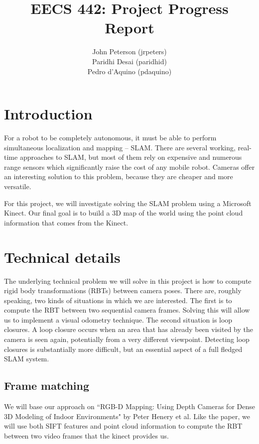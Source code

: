 \documentclass[12pt]{article}
\title{EECS 442: Project Progress Report}
\author{
	John Peterson (jrpeters)\\
	Paridhi Desai (paridhid)\\
	Pedro d'Aquino (pdaquino)}
\begin{document}
\maketitle

\section{Introduction}
For a robot to be completely autonomous, it must be able to perform simultaneous localization and
mapping -- SLAM. There are several working, real-time approaches to SLAM, but most of them
rely on expensive and numerous range sensors which significantly raise the cost of any mobile robot. Cameras
offer an interesting solution to this problem, because they are cheaper and more versatile.

For this project, we will investigate solving the SLAM problem using a Microsoft Kinect. Our final goal is
to build a 3D map of the world using the point cloud information that comes from the Kinect.

\section{Technical details}
The underlying technical problem we will solve in this project is how to compute rigid body transformations (RBTs) between camera poses. There are, roughly speaking, two kinds of situations in which we are interested. The first is to compute the RBT between two sequential camera frames. Solving this will allow us to implement a visual odometry technique. The second situation is loop closures. A loop closure occurs when an area that has already been visited by the camera is seen again, potentially from a very different viewpoint. Detecting loop closures is substantially more difficult, but an essential aspect of a full fledged SLAM system.

\subsection{Frame matching}
We will base our approach on ``RGB-D Mapping: Using Depth Cameras for Dense 3D Modeling of Indoor Environments" by Peter Henery et al. Like the paper, we will use both SIFT features and point cloud information to compute the RBT between two video frames that the kinect provides us.
\end{document}
